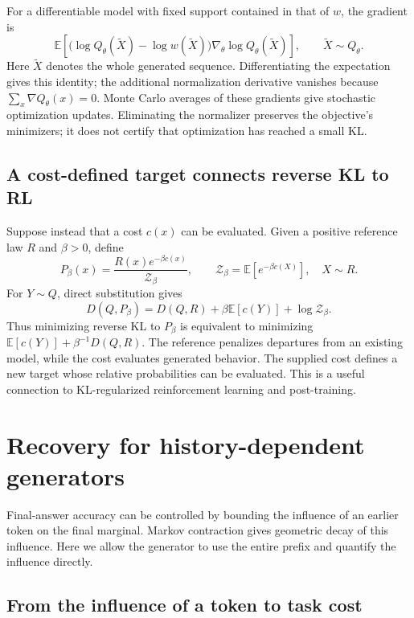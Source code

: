\documentclass[11pt,twoside]{article}
\newcommand{\E}{\mathbb E}
\newcommand{\KL}{D}
\theoremstyle{definition}
\theoremstyle{remark}
\begin{document}
For a differentiable model with fixed support contained in that of
\(w\), the gradient is
\[
 \E\!\left[
 \bigl(\log Q_\theta(\widetilde X)-\log w(\widetilde X)\bigr)
 \nabla_\theta\log Q_\theta(\widetilde X)
 \right],\qquad \widetilde X\sim Q_\theta.
\]
Here \(\widetilde X\) denotes the whole generated sequence.
Differentiating the expectation gives this identity; the additional
normalization derivative vanishes because \(\sum_x\nabla Q_\theta(x)=0\).
Monte Carlo averages of these gradients give stochastic optimization
updates. Eliminating the normalizer preserves the objective's minimizers;
it does not certify that optimization has reached a small KL.

\subsection{A cost-defined target connects reverse KL to RL}

Suppose instead that a cost \(c(x)\) can be evaluated.
Given a positive reference law \(R\) and \(\beta>0\), define
\[
 P_\beta(x)=\frac{R(x)e^{-\beta c(x)}}{\mathcal Z_\beta},
 \qquad \mathcal Z_\beta=\E[e^{-\beta c(X)}],\quad X\sim R.
\]
For \(Y\sim Q\), direct substitution gives
\begin{equation}
 \KL(Q, P_\beta)
 =\KL(Q, R)+\beta\E[c(Y)]+\log\mathcal Z_\beta.
 \label{eq:gibbs-cost}
\end{equation}
Thus minimizing reverse KL to \(P_\beta\) is equivalent to minimizing
\(\E[c(Y)]+\beta^{-1}\KL(Q,R)\).
The reference penalizes departures from an existing model, while the
cost evaluates generated behavior. The supplied cost defines a new
target whose relative probabilities can be evaluated. This is a useful
connection to KL-regularized reinforcement learning and post-training.

\section{Recovery for history-dependent generators}
\label{app:history-recovery}

Final-answer accuracy can be controlled by bounding the influence of an
earlier token on the final marginal. Markov contraction gives geometric
decay of this influence. Here we allow the generator to use the entire
prefix and quantify the influence directly.

\subsection{From the influence of a token to task cost}
\end{document}
